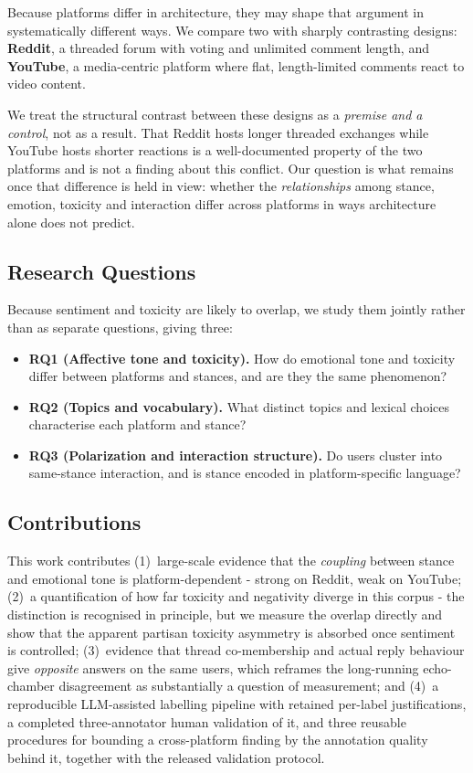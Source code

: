 \documentclass[pdflatex,sn-basic,Numbered,iicol]{sn-jnl}
\begin{document}
Because platforms differ in architecture, they may shape that argument in
systematically different ways. We compare two with sharply contrasting designs:
\textbf{Reddit}, a threaded forum with voting and unlimited comment length, and
\textbf{YouTube}, a media-centric platform where flat, length-limited comments react
to video content.

We treat the structural contrast between these designs as a \emph{premise and a
control}, not as a result. That Reddit hosts longer threaded exchanges while YouTube
hosts shorter reactions is a well-documented property of the two platforms and is
not a finding about this conflict. Our question is what remains once that difference
is held in view: whether the \emph{relationships} among stance, emotion, toxicity and
interaction differ across platforms in ways architecture alone does not predict.

\subsection{Research Questions}
Because sentiment and toxicity are likely to overlap, we study them jointly rather
than as separate questions, giving three:

\begin{itemize}[leftmargin=1.2em,itemsep=1pt,topsep=2pt]
  \item \textbf{RQ1 (Affective tone and toxicity).} How do emotional tone and
  toxicity differ between platforms and stances, and are they the same phenomenon?
  \item \textbf{RQ2 (Topics and vocabulary).} What distinct topics and lexical
  choices characterise each platform and stance?
  \item \textbf{RQ3 (Polarization and interaction structure).} Do users cluster into
  same-stance interaction, and is stance encoded in platform-specific language?
\end{itemize}

\subsection{Contributions}
This work contributes (1)~large-scale evidence that the \emph{coupling} between
stance and emotional tone is platform-dependent - strong on Reddit, weak on
YouTube; (2)~a quantification of how far toxicity and negativity
diverge in this corpus - the distinction is recognised in principle, but we measure
the overlap directly and show that the apparent partisan toxicity asymmetry is
absorbed once sentiment is controlled; (3)~evidence that thread co-membership and actual reply
behaviour give \emph{opposite} answers on the same users, which reframes the
long-running echo-chamber disagreement as substantially a question of measurement; and (4)~a reproducible LLM-assisted labelling
pipeline with retained per-label justifications, a completed three-annotator human validation of it, and three reusable procedures for bounding a cross-platform finding by the annotation quality behind it, together with the released validation
protocol.
\end{document}
